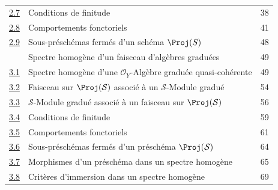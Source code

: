 \begin{longtable}{@{}p{}p{}r@{}}
\hyperref[subsection:II.2.7-fr]{2.7} & Conditions de finitude & 38\\
\hyperref[subsection:II.2.8-fr]{2.8} & Comportements fonctoriels & 41\\
\hyperref[subsection:II.2.9-fr]{2.9} & Sous-préschémas fermés d'un schéma $\Proj(S)$ & 48\\
\hyperref[section:II.3-fr]{\textsection3} & Spectre homogène d'un faisceau d'algèbres graduées & 49\\
\hyperref[subsection:II.3.1-fr]{3.1} & Spectre homogène d'une $\mathcal{O}_Y$-Algèbre graduée quasi-cohérente & 49\\
\hyperref[subsection:II.3.2-fr]{3.2} & Faisceau sur $\Proj(\mathcal{S})$ associé à un $\mathcal{S}$-Module gradué & 54\\
\hyperref[subsection:II.3.3-fr]{3.3} & $\mathcal{S}$-Module gradué associé à un faisceau sur $\Proj(\mathcal{S})$ & 56\\
\hyperref[subsection:II.3.4-fr]{3.4} & Conditions de finitude & 59\\
\hyperref[subsection:II.3.5-fr]{3.5} & Comportements fonctoriels & 61\\
\hyperref[subsection:II.3.6-fr]{3.6} & Sous-préschémas fermés d'un préschéma $\Proj(\mathcal{S})$ & 64\\
\hyperref[subsection:II.3.7-fr]{3.7} & Morphismes d'un préschéma dans un spectre homogène & 65\\
\hyperref[subsection:II.3.8-fr]{3.8} & Critères d'immersion dans un spectre homogène & 69\\
\end{longtable}
